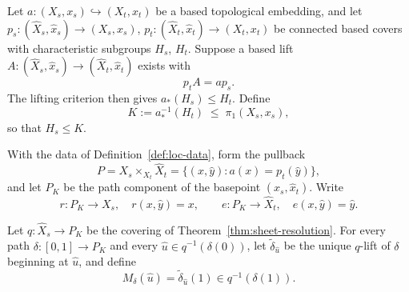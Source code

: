 \begin{definition}\label{def:loc-data}
Let \( a\colon(X_s,x_s)\hookrightarrow(X_t,x_t) \) be a based topological
embedding, and let
\( p_s\colon(\widehat X_s,\widehat x_s)\to(X_s,x_s) \),
\( p_t\colon(\widehat X_t,\widehat x_t)\to(X_t,x_t) \)
be connected based covers with characteristic subgroups \( H_s \),
\( H_t \).  Suppose a based lift
\( A\colon(\widehat X_s,\widehat x_s)\to(\widehat X_t,\widehat x_t) \)
exists with
\begin{equation}\label{eq:lift-square}
  p_t A = a p_s .
\end{equation}
The lifting criterion then gives \( a_*(H_s)\leq H_t \).  Define
\begin{equation}\label{eq:K-def}
  K := a_*^{-1}(H_t)\;\leq\;\pi_1(X_s,x_s),
\end{equation}
so that \( H_s\leq K \).
\end{definition}

\begin{definition}\label{def:pullback-component}
With the data of Definition~\ref{def:loc-data}, form the pullback
\begin{equation}\label{eq:pullback}
  P = X_s\times_{X_t}\widehat X_t
    = \bigl\{(x,\widehat y): a(x)=p_t(\widehat y)\bigr\},
\end{equation}
and let \( P_K \) be the path component of the basepoint
\( (x_s,\widehat x_t) \).  Write
\begin{equation}\label{eq:legs}
  r\colon P_K\to X_s,\quad r(x,\widehat y)=x,
  \qquad
  e\colon P_K\to\widehat X_t,\quad e(x,\widehat y)=\widehat y .
\end{equation}
\end{definition}

\begin{definition}\label{def:sheet-transport}
Let \( q\colon\widehat X_s\to P_K \) be the covering of
Theorem~\ref{thm:sheet-resolution}.  For every path
\( \delta\colon[0,1]\to P_K \) and every
\( \widehat u\in q^{-1}(\delta(0)) \), let
\( \widetilde\delta_{\widehat u} \) be the unique \( q \)-lift of
\( \delta \) beginning at \( \widehat u \), and define
\begin{equation}\label{eq:transport-def}
  M_\delta(\widehat u)
  = \widetilde\delta_{\widehat u}(1)
  \in q^{-1}(\delta(1)).
\end{equation}
\end{definition}

